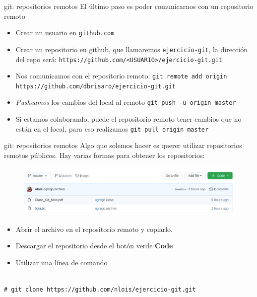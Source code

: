 \documentclass{beamer}
\newcommand{\shellcmd}[1]{\\\indent\indent\texttt{\footnotesize\# #1}\\}
\begin{document}
\begin{frame}{git: repositorios remotos}
El último paso es poder comunicarnos con un repositorio remoto

\begin{itemize}
    \item Crear un usuario en \texttt{github.com}
    \item Crear un repositorio en github, que llamaremos \texttt{ejercicio-git}, la dirección del repo será: \texttt{https://github.com/<USUARIO>/ejercicio-git.git}
    \item Nos comunicamos con el repositorio remoto: \texttt{git remote add origin https://github.com/dbrisaro/ejercicio-git.git}
    \item \textit{Pusheamos} los cambios del local al remoto \texttt{git push -u origin master}
    \item Si estamos colaborando, puede el repositorio remoto tener cambios que no están en el local, para eso realizamos \texttt{git pull origin master}
    
\end{itemize}
\end{frame}

\begin{frame}{git: repositorios remotos}
Algo que solemos hacer es querer utilizar repositorios remotos públicos. Hay varias formas para obtener los repositorios:

\begin{figure}
    \centering
    \includegraphics[scale=0.3]{github_download.png}
\end{figure}

\begin{itemize}
    \item Abrir el archivo en el repositorio remoto y copiarlo.
    \item Descargar el repositorio desde el botón verde \textbf{Code}
    \item Utilizar una línea de comando
\end{itemize}
\shellcmd{git clone https://github.com/nlois/ejercicio-git.git}

\end{frame}
\end{document}

